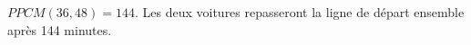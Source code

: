 %
%
    \(PPCM(36,48) = 144\). Les deux voitures repasseront la ligne de départ ensemble après 144 minutes.
